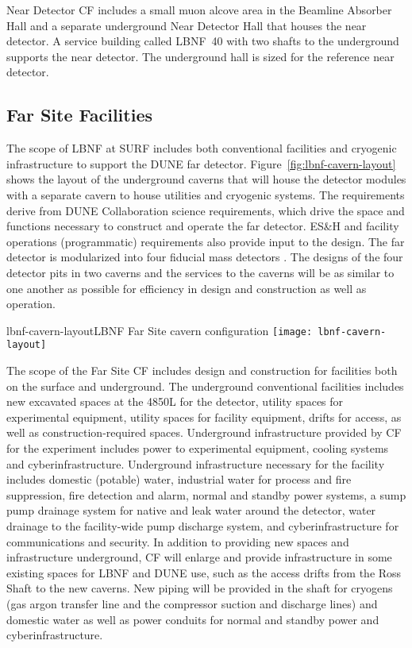 Near Detector CF includes a small muon alcove area in the Beamline Absorber Hall and a separate underground Near Detector Hall that houses the near detector. A service building called LBNF~40 with two shafts to the underground supports the near detector. The underground hall is sized for the reference near detector.
 
\subsection{Far Site Facilities}
 
The scope of LBNF at SURF includes both conventional facilities and cryogenic infrastructure to support the DUNE far detector. Figure~\ref{fig:lbnf-cavern-layout} shows the layout of the underground caverns that will house the detector modules with a separate cavern to house utilities and cryogenic systems. The requirements derive from DUNE Collaboration science requirements, which drive the space and functions necessary to construct and operate the far detector.  ES\&H and facility operations (programmatic) requirements also provide input to the design. The far detector is modularized into four  fiducial mass detectors . The designs of the four detector pits in two caverns and the services to the caverns will be as similar to one another as possible for efficiency in design and construction as well as operation. 
 
\begin{cdrfigure}{lbnf-cavern-layout}{LBNF Far Site cavern configuration}  
\texttt{[image: lbnf-cavern-layout]}
\end{cdrfigure}
 
 
The scope of the Far Site CF includes design and construction for facilities both on the surface and underground. The underground conventional facilities includes new excavated spaces at the 4850L for the detector, utility spaces for experimental equipment, utility spaces for facility equipment, drifts for access, as well as construction-required spaces. Underground infrastructure provided by CF for the experiment includes power to experimental equipment, cooling systems and cyberinfrastructure. Underground infrastructure necessary for the facility includes domestic (potable) water, industrial water for process and fire suppression, fire detection and alarm, normal and standby power systems, a sump pump drainage system for native and leak water around the detector, water drainage to the facility-wide pump discharge system, and cyberinfrastructure for communications and security.
In addition to providing new spaces and infrastructure underground, CF will enlarge and provide infrastructure in some existing spaces for LBNF and DUNE use, such as the access drifts from the Ross Shaft to the new caverns. New piping will be provided in the shaft for cryogens (gas argon transfer line and the compressor suction and discharge lines) and domestic water as well as power conduits for normal and standby power and cyberinfrastructure. 
 
